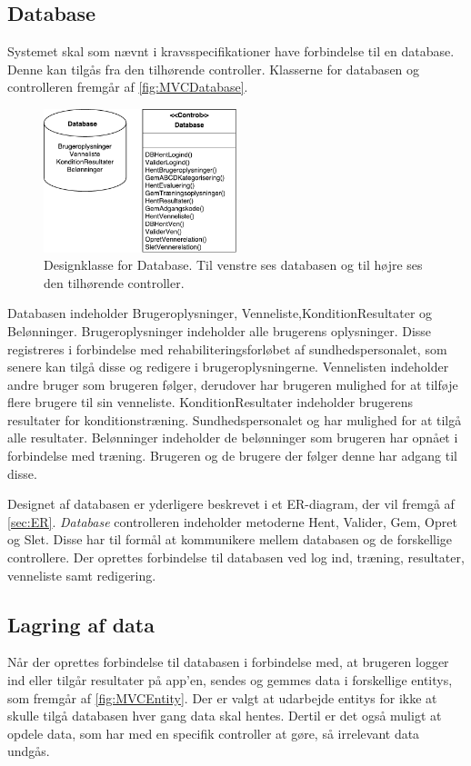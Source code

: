 \subsection*{Database}
Systemet skal som nævnt i kravsspecifikationer have forbindelse til en database. Denne kan tilgås fra den tilhørende controller. Klasserne for databasen og controlleren fremgår af \autoref{fig:MVCDatabase}. 

\begin{figure} [H]
\centering
\includegraphics[width=0.5\textwidth]{figures/MVC/MVCDatabase}
\caption{Designklasse for Database. Til venstre ses databasen og til højre ses den tilhørende controller.}
\label{fig:MVCDatabase}
\end{figure}

\noindent
Databasen indeholder Brugeroplysninger, Venneliste,KonditionResultater og Belønninger. Brugeroplysninger indeholder alle brugerens oplysninger. Disse registreres i forbindelse med rehabiliteringsforløbet af sundhedspersonalet, som senere kan tilgå disse og redigere i brugeroplysningerne. Vennelisten indeholder andre bruger som brugeren følger, derudover har brugeren mulighed for at tilføje flere brugere til sin venneliste. KonditionResultater indeholder brugerens resultater for konditionstræning. Sundhedspersonalet og har mulighed for at tilgå alle resultater. Belønninger indeholder de belønninger som brugeren har opnået i forbindelse med træning. Brugeren og de brugere der følger denne har adgang til disse.  

Designet af databasen er yderligere beskrevet i et ER-diagram, der vil fremgå af \autoref{sec:ER}. \textit{Database} controlleren indeholder metoderne Hent, Valider, Gem, Opret og Slet. Disse har til formål at kommunikere mellem databasen og de forskellige controllere. Der oprettes forbindelse til databasen ved log ind, træning, resultater, venneliste samt redigering. 

\subsection*{Lagring af data}  \label{sec:entity}
Når der oprettes forbindelse til databasen i forbindelse med, at brugeren logger ind eller tilgår resultater på app'en, sendes og gemmes data i forskellige entitys, som fremgår af \autoref{fig:MVCEntity}. Der er valgt at udarbejde entitys for ikke at skulle tilgå databasen hver gang data skal hentes. Dertil er det også muligt at opdele data, som har med en specifik controller at gøre, så irrelevant data undgås. 

